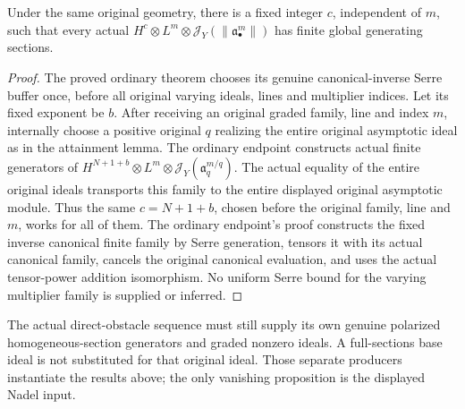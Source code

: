 \begin{corollary}
\label{cor:c0n-asymptotic-uniform-hyperplane-generation}
\leanok
{}
Under the same original geometry, there is a fixed integer $c$, independent
of $m$, such that every actual
$H^c\otimes L^m\otimes\mathcal J_Y(\|\mathfrak a_\bullet^m\|)$
has finite global generating sections.
\end{corollary}
\begin{proof}
The proved ordinary theorem chooses its genuine canonical-inverse Serre
buffer once, before all original varying ideals, lines and multiplier
indices. Let its fixed exponent be $b$. After receiving an original graded
family, line and index $m$, internally choose a positive original $q$
realizing the entire original asymptotic ideal as in the attainment lemma.
The ordinary endpoint constructs actual finite generators of
$H^{N+1+b}\otimes L^m\otimes\mathcal J_Y(\mathfrak a_q^{m/q})$.
The actual equality of the entire original ideals transports this family
to the entire displayed original asymptotic module. Thus the same
$c=N+1+b$, chosen before the original family, line and $m$, works for all
of them. The ordinary endpoint's proof constructs the fixed inverse
canonical finite family by Serre generation, tensors it with its actual
canonical family, cancels the original canonical evaluation, and uses
the actual tensor-power addition isomorphism. No uniform Serre bound for
the varying multiplier family is supplied or inferred.
\end{proof}

The actual direct-obstacle sequence must still supply its own genuine
polarized homogeneous-section generators and graded nonzero ideals. A
full-sections base ideal is not substituted for that original ideal.
Those separate producers instantiate the results above; the only
vanishing proposition is the displayed Nadel input.
